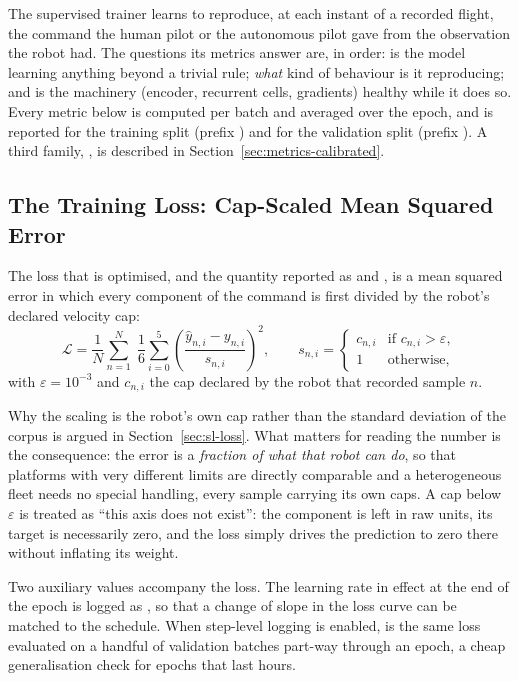 The supervised trainer learns to reproduce, at each instant of a recorded
flight, the command the human pilot or the autonomous pilot gave from the observation the robot had.
The questions its metrics answer are, in order: is the model learning anything
beyond a trivial rule; \emph{what} kind of behaviour is it reproducing; and is
the machinery (encoder, recurrent cells, gradients) healthy while it does so.
Every metric below is computed per batch and averaged over the epoch, and is
reported for the training split (prefix ) and for the validation
split (prefix ). A third family, , is described in
Section~\ref{sec:metrics-calibrated}.

\subsection{The Training Loss: Cap-Scaled Mean Squared Error}
\label{sec:metrics-loss}

The loss that is optimised, and the quantity reported as  and
, is a mean squared error in which every component of the command
is first divided by the robot's declared velocity cap:
%
\begin{equation}
  \mathcal{L}
  = \frac{1}{N}\sum_{n=1}^{N}\;\frac{1}{6}\sum_{i=0}^{5}
    \left(\frac{\hat{y}_{n,i} - y_{n,i}}{s_{n,i}}\right)^{2},
  \qquad
  s_{n,i} =
  \begin{cases}
    c_{n,i} & \text{if } c_{n,i} > \varepsilon,\\
    1       & \text{otherwise},
  \end{cases}
  \label{eq:capscaled}
\end{equation}
%
with $\varepsilon = 10^{-3}$ and $c_{n,i}$ the cap declared by the robot that
recorded sample $n$.

Why the scaling is the robot's own cap rather than the standard deviation of
the corpus is argued in Section~\ref{sec:sl-loss}. What matters for reading the
number is the consequence: the error is a \emph{fraction of what that robot can
do}, so that platforms with very different limits are directly comparable and a
heterogeneous fleet needs no special handling, every sample carrying its own
caps. A cap below $\varepsilon$ is treated as ``this axis does not exist'':
the component is left in raw units, its target is necessarily zero, and the
loss simply drives the prediction to zero there without inflating its weight.

Two auxiliary values accompany the loss. The learning rate in effect at the
end of the epoch is logged as , so that a change of slope in the loss
curve can be matched to the schedule. When step-level logging is enabled,
 is the same loss evaluated on a handful of validation
batches part-way through an epoch, a cheap generalisation check for epochs that
last hours.


